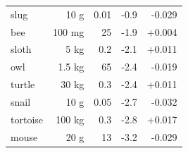 \begin{table}[tp]
{\begin{tabular}{@{}lrrrr@{}}
slug & 10 g & 0.01 & -0.9 & -0.029\\
bee & 100 mg & 25 & -1.9 & +0.004\\
sloth & 5 kg & 0.2 & -2.1 & +0.011\\
owl & 1.5 kg & 65 & -2.4 & -0.019\\
turtle & 30 kg & 0.3 & -2.4 & +0.011\\
snail & 10 g & 0.05 & -2.7 & -0.032\\
tortoise & 100 kg & 0.3 & -2.8 & +0.017\\
mouse & 20 g & 13 & -3.2 & -0.029\\
\bottomrule
\end{tabular}}
\end{table}


